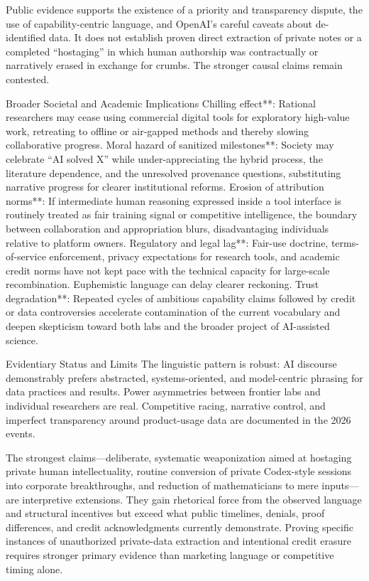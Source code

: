 Public evidence supports the existence of a priority and transparency dispute, the use of capability-centric language, and OpenAI’s careful caveats about de-identified data. It does not establish proven direct extraction of private notes or a completed “hostaging” in which human authorship was contractually or narratively erased in exchange for crumbs. The stronger causal claims remain contested.

Broader Societal and Academic Implications
Chilling effect**: Rational researchers may cease using commercial digital tools for exploratory high-value work, retreating to offline or air-gapped methods and thereby slowing collaborative progress.
Moral hazard of sanitized milestones**: Society may celebrate “AI solved X” while under-appreciating the hybrid process, the literature dependence, and the unresolved provenance questions, substituting narrative progress for clearer institutional reforms.
Erosion of attribution norms**: If intermediate human reasoning expressed inside a tool interface is routinely treated as fair training signal or competitive intelligence, the boundary between collaboration and appropriation blurs, disadvantaging individuals relative to platform owners.
Regulatory and legal lag**: Fair-use doctrine, terms-of-service enforcement, privacy expectations for research tools, and academic credit norms have not kept pace with the technical capacity for large-scale recombination. Euphemistic language can delay clearer reckoning.
Trust degradation**: Repeated cycles of ambitious capability claims followed by credit or data controversies accelerate contamination of the current vocabulary and deepen skepticism toward both labs and the broader project of AI-assisted science.

Evidentiary Status and Limits
The linguistic pattern is robust: AI discourse demonstrably prefers abstracted, systems-oriented, and model-centric phrasing for data practices and results. Power asymmetries between frontier labs and individual researchers are real. Competitive racing, narrative control, and imperfect transparency around product-usage data are documented in the 2026 events.

The strongest claims—deliberate, systematic weaponization aimed at hostaging private human intellectuality, routine conversion of private Codex-style sessions into corporate breakthroughs, and reduction of mathematicians to mere inputs—are interpretive extensions. They gain rhetorical force from the observed language and structural incentives but exceed what public timelines, denials, proof differences, and credit acknowledgments currently demonstrate. Proving specific instances of unauthorized private-data extraction and intentional credit erasure requires stronger primary evidence than marketing language or competitive timing alone.

